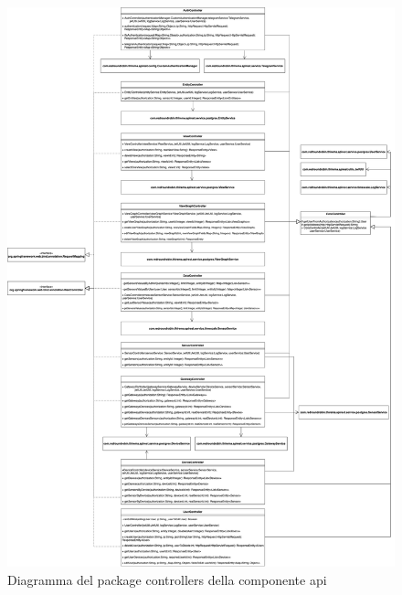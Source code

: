 		\begin{figure}[H]
			\centering
			\includegraphics[scale=0.295]{res/images/API/Controllers.png}
			\caption{Diagramma del package controllers della componente api}
			\label{Diagramma 13}
		\end{figure}
